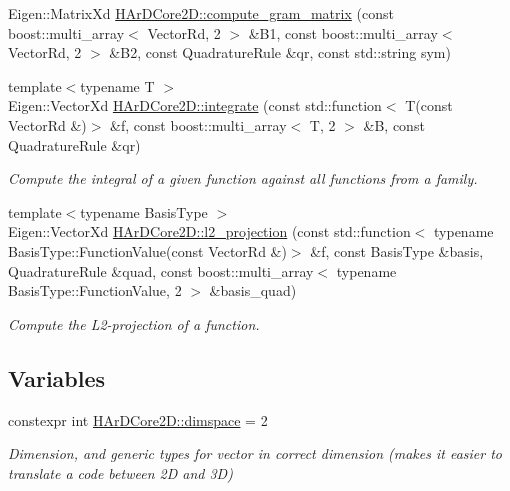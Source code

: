 \begin{DoxyCompactItemize}
\item 
Eigen\+::\+Matrix\+Xd \hyperlink{group__Basis_gafe22102ff7c7e6dbeb63498396f2b54c}{H\+Ar\+D\+Core2\+D\+::compute\+\_\+gram\+\_\+matrix} (const boost\+::multi\+\_\+array$<$ Vector\+Rd, 2 $>$ \&B1, const boost\+::multi\+\_\+array$<$ Vector\+Rd, 2 $>$ \&B2, const Quadrature\+Rule \&qr, const std\+::string sym)
\item 
{\footnotesize template$<$typename T $>$ }\\Eigen\+::\+Vector\+Xd \hyperlink{group__Basis_ga8b3e4c44e672ad940f3dd12f2b0ae8cc}{H\+Ar\+D\+Core2\+D\+::integrate} (const std\+::function$<$ T(const Vector\+Rd \&)$>$ \&f, const boost\+::multi\+\_\+array$<$ T, 2 $>$ \&B, const Quadrature\+Rule \&qr)
\begin{DoxyCompactList}\small\item\em Compute the integral of a given function against all functions from a family. \end{DoxyCompactList}\item 
{\footnotesize template$<$typename Basis\+Type $>$ }\\Eigen\+::\+Vector\+Xd \hyperlink{group__Basis_ga650f15db9b781f0ad398e54d96a5ba39}{H\+Ar\+D\+Core2\+D\+::l2\+\_\+projection} (const std\+::function$<$ typename Basis\+Type\+::\+Function\+Value(const Vector\+Rd \&)$>$ \&f, const Basis\+Type \&basis, Quadrature\+Rule \&quad, const boost\+::multi\+\_\+array$<$ typename Basis\+Type\+::\+Function\+Value, 2 $>$ \&basis\+\_\+quad)
\begin{DoxyCompactList}\small\item\em Compute the L2-\/projection of a function. \end{DoxyCompactList}\end{DoxyCompactItemize}
\subsection*{Variables}
\begin{DoxyCompactItemize}
\item 
\mbox{\label{group__Basis_ga99ab631a06b5d5a5f9f9673883c92ffe}} 
constexpr int \hyperlink{group__Basis_ga99ab631a06b5d5a5f9f9673883c92ffe}{H\+Ar\+D\+Core2\+D\+::dimspace} = 2
\begin{DoxyCompactList}\small\item\em Dimension, and generic types for vector in correct dimension (makes it easier to translate a code between 2D and 3D) \end{DoxyCompactList}\end{DoxyCompactItemize}


